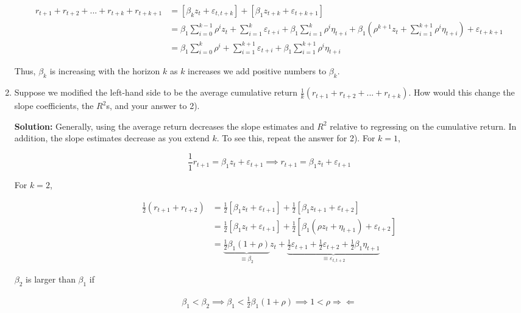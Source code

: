 \documentclass{article}
\begin{document}
\begin{enumerate}
\begin{align*}
r_{t+1} + r_{t+2} + ... + r_{t+k} + r_{t+k+1} 
&= [\beta_{k} z_t + \varepsilon_{t,t+k}] + [\beta_1 z_{t+k} + \varepsilon_{t+k+1}]\\
&= \beta_1 \sum_{i=0}^{k-1} \rho^i z_t + \sum_{i=1}^k \varepsilon_{t+i} + \beta_1 \sum_{i=1}^k \rho^i \eta_{t+i} + \beta_1 (\rho^{k+1} z_t + \sum_{i=1}^{k+1} \rho^i \eta_{t+i}) + \varepsilon_{t+k+1}\\
&= \beta_1 \sum_{i=0}^{k} \rho^i + \sum_{i=1}^{k+1} \varepsilon_{t+i} + \beta_1 \sum_{i=1}^{k+1} \rho^i \eta_{t+i}
\end{align*}

Thus, $\beta_k$ is increasing with the horizon $k$ as $k$ increases we add positive numbers to $\beta_k$.

\pagebreak

\item Suppose we modified the left-hand side to be the average cumulative return $\frac{1}{k} (r_{t+1} + r_{t+2} + . . . + r_{t+k})$. How would this change the slope coefficients, the $R^2$s, and your answer to 2).

\textbf{Solution:} Generally, using the average return decreases the slope estimates and $R^2$ relative to regressing on the cumulative return. In addition, the slope estimates decrease as you extend $k$. To see this, repeat the answer for 2). For $k=1$,

$$
\frac{1}{1}r_{t+1} = \beta_1 z_t + \varepsilon_{t+1} \implies r_{t+1} = \beta_1 z_t + \varepsilon_{t+1}
$$

For $k = 2$,

\begin{align*}
\frac{1}{2}(r_{t+1} + r_{t+2})
&= \frac{1}{2}[\beta_1 z_t + \varepsilon_{t+1}] + \frac{1}{2}[\beta_1 z_{t+1} + \varepsilon_{t+2}]\\
&= \frac{1}{2}[\beta_1 z_t + \varepsilon_{t+1}] + \frac{1}{2}[\beta_1 (\rho z_{t} + \eta_{t+1}) + \varepsilon_{t+2}]\\
&= \underbrace{\frac{1}{2}\beta_1 (1 +\rho)}_{\equiv \beta_2} z_t + \underbrace{\frac{1}{2}\varepsilon_{t+1}+ \frac{1}{2}\varepsilon_{t+2} + \frac{1}{2}\beta_1 \eta_{t+1}}_{\equiv \varepsilon_{t,t+2}}
\end{align*}

$\beta_2$ is larger than $\beta_1$ if

\begin{align*}
\beta_1 < \beta_2 \implies \beta_1 < \frac{1}{2}\beta_1 (1 +\rho) \implies 1 < \rho \Rightarrow \Leftarrow
\end{align*}


\end{enumerate}
\end{document}
